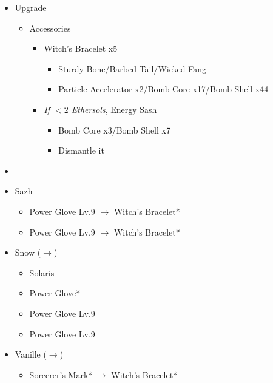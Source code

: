 \begin{upgrade}
	\begin{itemize}
		\item Upgrade
			\begin{itemize}
				\item Accessories
					\begin{itemize}
						\item Witch's Bracelet x5
							\begin{itemize}
								\item Sturdy Bone/Barbed Tail/Wicked Fang
								\item Particle Accelerator x2/Bomb Core x17/Bomb Shell x44
							\end{itemize}
						\item \textit{If $<2$ Ethersols}, Energy Sash
							\begin{itemize}
								\item Bomb Core x3/Bomb Shell x7
								\item Dismantle it
							\end{itemize}
					\end{itemize}
			\end{itemize}
	\end{itemize}
\end{upgrade}
\vfill

\begin{menu}
	\begin{itemize}
	\paradigm
		\begin{itemize}
			\item {}%
				{\paradigmline{\com}{(\rav)}{(\sab)}}%
				{\paradigmline{\com}{(\rav)}{\med}}%
				{\paradigmline[4]{\com}{\sen}{\med}}%
				{\paradigmline{\syn}{\sen}{\med}}%
				{\paradigmline{(\rav)}{(\sen)}{(\med)}}%
				{\paradigmline{(\sen)}{(\sen)}{(\med)}}%
		\end{itemize}
	\equip
		\begin{itemize}
			\item Sazh
				\begin{itemize}
					\item Power Glove Lv.9 $\rightarrow$ Witch's Bracelet*
					\item Power Glove Lv.9 $\rightarrow$ Witch's Bracelet*
				\end{itemize}
			\item Snow ($\rightarrow$)
				\begin{itemize}
					\item Solaris
					\item Power Glove*
					\item Power Glove Lv.9
					\item Power Glove Lv.9
				\end{itemize}
			\item Vanille ($\rightarrow$)
				\begin{itemize}
					\item Sorcerer's Mark* $\rightarrow$ Witch's Bracelet*
				\end{itemize}
		\end{itemize}
	\end{itemize}
\end{menu}

